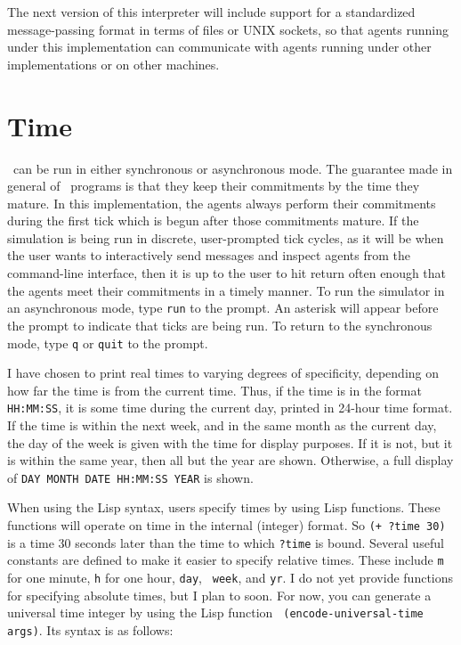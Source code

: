 The next version of this interpreter will include support for a
standardized message-passing format in terms of files or UNIX sockets,
so that agents running under this implementation can communicate with
agents running under other implementations or on other machines.


\section{Time}
\label{time}

\ao\ can be run in either synchronous or asynchronous mode.  The
guarantee made in general of \ao\ programs is that they keep their
commitments by the time they mature.  In this implementation, the
agents always perform their commitments during the first tick which is
begun after those commitments mature.  If the simulation is being run
in discrete, user-prompted tick cycles, as it will be when the user
wants to interactively send messages and inspect agents from the
command-line interface, then it is up to the user to hit return often
enough that the agents meet their commitments in a timely manner.  To
run the simulator in an asynchronous mode, type {\tt run} to the
prompt.  An asterisk will appear before the prompt to indicate that
ticks are being run.  To return to the synchronous mode, type {\tt q}
or {\tt quit} to the prompt.

I have chosen to print real times to varying degrees of specificity,
depending on how far the time is from the current time.  Thus, if the
time is in the format {\tt HH:MM:SS}, it is some time during the
current day, printed in 24-hour time format.  If the time is within
the next week, and in the same month as the current day, the day of
the week is given with the time for display purposes.  If it is not,
but it is within the same year, then all but the year are shown.
Otherwise, a full display of {\tt DAY MONTH DATE HH:MM:SS YEAR} is
shown.

When using the Lisp syntax, users specify times by using Lisp
functions.  These functions will operate on time in the internal
(integer) format.  So {\tt (+ ?time 30)} is a time 30 seconds later
than the time to which {\tt ?time} is bound.  Several useful constants
are defined to make it easier to specify relative times.  These
include {\tt m} for one minute, {\tt h} for one hour, {\tt day}, {\tt
week}, and {\tt yr}.  I do not yet provide functions for specifying
absolute times, but I plan to soon.  For now, you can generate a
universal time integer by using the Lisp function {\tt
(encode-universal-time {args})}.  Its syntax is as follows:

